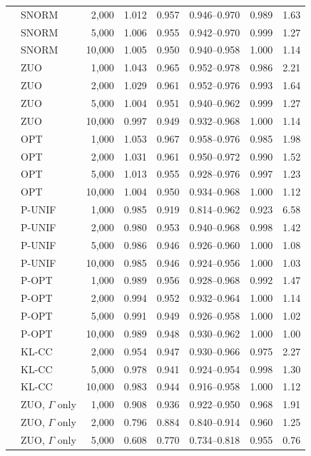\begin{tabular}{llrrrrrr}
 & SNORM & 2,000 & 1.012 & 0.957 & 0.946--0.970 & 0.989 & 1.63\\
 & SNORM & 5,000 & 1.006 & 0.955 & 0.942--0.970 & 0.999 & 1.27\\
 & SNORM & 10,000 & 1.005 & 0.950 & 0.940--0.958 & 1.000 & 1.14\\
 & ZUO & 1,000 & 1.043 & 0.965 & 0.952--0.978 & 0.986 & 2.21\\
 & ZUO & 2,000 & 1.029 & 0.961 & 0.952--0.976 & 0.993 & 1.64\\
 & ZUO & 5,000 & 1.004 & 0.951 & 0.940--0.962 & 0.999 & 1.27\\
 & ZUO & 10,000 & 0.997 & 0.949 & 0.932--0.968 & 1.000 & 1.14\\
 & OPT & 1,000 & 1.053 & 0.967 & 0.958--0.976 & 0.985 & 1.98\\
 & OPT & 2,000 & 1.031 & 0.961 & 0.950--0.972 & 0.990 & 1.52\\
 & OPT & 5,000 & 1.013 & 0.955 & 0.928--0.976 & 0.997 & 1.23\\
 & OPT & 10,000 & 1.004 & 0.950 & 0.934--0.968 & 1.000 & 1.12\\
 & P-UNIF & 1,000 & 0.985 & 0.919 & 0.814--0.962 & 0.923 & 6.58\\
 & P-UNIF & 2,000 & 0.980 & 0.953 & 0.940--0.968 & 0.998 & 1.42\\
 & P-UNIF & 5,000 & 0.986 & 0.946 & 0.926--0.960 & 1.000 & 1.08\\
 & P-UNIF & 10,000 & 0.985 & 0.946 & 0.924--0.956 & 1.000 & 1.03\\
 & P-OPT & 1,000 & 0.989 & 0.956 & 0.928--0.968 & 0.992 & 1.47\\
 & P-OPT & 2,000 & 0.994 & 0.952 & 0.932--0.964 & 1.000 & 1.14\\
 & P-OPT & 5,000 & 0.991 & 0.949 & 0.926--0.958 & 1.000 & 1.02\\
 & P-OPT & 10,000 & 0.989 & 0.948 & 0.930--0.962 & 1.000 & 1.00\\
 & KL-CC & 2,000 & 0.954 & 0.947 & 0.930--0.966 & 0.975 & 2.27\\
 & KL-CC & 5,000 & 0.978 & 0.941 & 0.924--0.954 & 0.998 & 1.30\\
 & KL-CC & 10,000 & 0.983 & 0.944 & 0.916--0.958 & 1.000 & 1.12\\
 & ZUO, \(\Gamma\) only & 1,000 & 0.908 & 0.936 & 0.922--0.950 & 0.968 & 1.91\\
 & ZUO, \(\Gamma\) only & 2,000 & 0.796 & 0.884 & 0.840--0.914 & 0.960 & 1.25\\
 & ZUO, \(\Gamma\) only & 5,000 & 0.608 & 0.770 & 0.734--0.818 & 0.955 & 0.76\\

\end{tabular}
